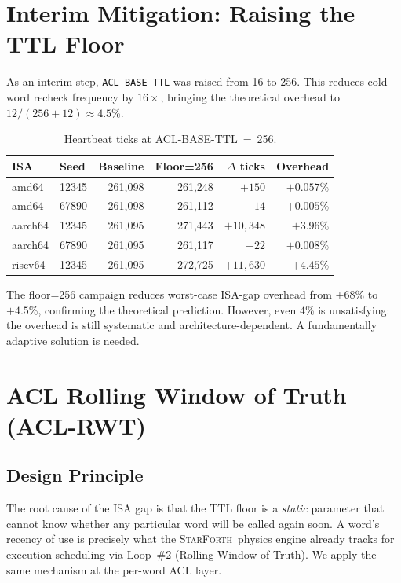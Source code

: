 \documentclass[11pt,letterpaper,openany]{article}
\newcommand{\SF}{\textsc{StarForth}\xspace}
\begin{document}
\section{Interim Mitigation: Raising the TTL Floor}
\label{sec:floor256}

As an interim step, \texttt{ACL-BASE-TTL} was raised from 16 to 256.
This reduces cold-word recheck frequency by $16\times$, bringing the
theoretical overhead to $12/(256+12) \approx 4.5$\%.

\begin{table}[H]
\centering
\caption{Heartbeat ticks at ACL-BASE-TTL~=~256.}
\label{tab:floor256}
\begin{tabular}{llrrrr}
\toprule
\textbf{ISA} & \textbf{Seed} & \textbf{Baseline} & \textbf{Floor=256} & \textbf{$\Delta$ ticks} & \textbf{Overhead} \\
\midrule
amd64   & 12345 & 261,098 & 261,248 & $+150$     & $+0.057\%$ \\
amd64   & 67890 & 261,098 & 261,112 & $+14$      & $+0.005\%$ \\
\midrule
aarch64 & 12345 & 261,095 & 271,443 & $+10,348$  & $+3.96\%$  \\
aarch64 & 67890 & 261,095 & 261,117 & $+22$      & $+0.008\%$ \\
\midrule
riscv64 & 12345 & 261,095 & 272,725 & $+11,630$  & $+4.45\%$  \\
\bottomrule
\end{tabular}
\end{table}

\noindent
The floor=256 campaign reduces worst-case ISA-gap overhead from
$+68$\% to $+4.5$\%, confirming the theoretical prediction.  However,
even $4$\% is unsatisfying: the overhead is still systematic and
architecture-dependent.  A fundamentally adaptive solution is needed.

\section{ACL Rolling Window of Truth (ACL-RWT)}
\label{sec:aclrwt}

\subsection{Design Principle}

The root cause of the ISA gap is that the TTL floor is a
\emph{static} parameter that cannot know whether any particular word
will be called again soon.  A word's recency of use is precisely what
the \SF\ physics engine already tracks for execution scheduling via
Loop~\#2 (Rolling Window of Truth).  We apply the same mechanism at
the per-word ACL layer.
\end{document}
